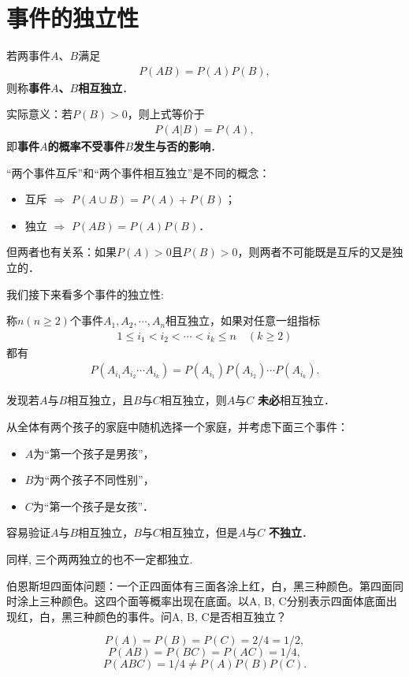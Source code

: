 \section{事件的独立性}

\begin{definition}
    若两事件$A$、$B$满足
    \begin{align*}
        P(AB)= P(A) P(B),
    \end{align*}
    则称\textbf{事件$A$、$B$相互独立}．%
\end{definition}

实际意义：若$P(B)>0$，则上式等价于
    \begin{align*}
        P(A|B)= P(A),
    \end{align*}
    即\textbf{事件$A$的概率不受事件$B$发生与否的影响}．

\begin{remark}
    “两个事件互斥”和“两个事件相互独立”是不同的概念：
    \begin{itemize}
        \item 互斥 $\Rightarrow$ $P(A\cup B)=P(A)+P(B)$；
        \item 独立 $\Rightarrow$ $P(AB)=P(A)P(B)$．
    \end{itemize}
    但两者也有关系：如果$P(A)>0$且$P(B)>0$，则两者不可能既是互斥的又是独立的．
\end{remark}

我们接下来看多个事件的独立性: 

\begin{definition}
    称$n(n\ge 2)$个事件$A_1, A_2, \cdots, A_n$相互独立，如果对任意一组指标
    \begin{align*}
        1\le i_1<i_2< \cdots <i_k\le n\quad (k\ge 2)
    \end{align*}
    都有
    \begin{align*}
        P(A_{i_1}A_{i_2}\cdots A_{i_k})=P(A_{i_1})P(A_{i_2})\cdots  P(A_{i_k}).
    \end{align*}
\end{definition}

发现若$A$与$B$相互独立，且$B$与$C$相互独立，则$A$与$C$ \textbf{未必}相互独立．
\begin{example}
    从全体有两个孩子的家庭中随机选择一个家庭，并考虑下面三个事件：
    \begin{itemize}
        \item $A$为“第一个孩子是男孩”，
        \item $B$为“两个孩子不同性别”，
        \item $C$为“第一个孩子是女孩”．
    \end{itemize}
    容易验证$A$与$B$相互独立，$B$与$C$相互独立，但是$A$与$C$ \textbf{不独立}．

    同样, 三个两两独立的也不一定都独立. 

    伯恩斯坦四面体问题：一个正四面体有三面各涂上红，白，黑三种颜色。第四面同时涂上三种颜色。这四个面等概率出现在底面。以A, B, C分别表示四面体底面出现红，白，黑三种颜色的事件。问A, B, C是否相互独立？

    $$
            P(A)=P(B)=P(C)=2/4=1/2,
        $$
        $$
            P(AB)=P(BC)=P(AC)=1/4,
        $$
        $$
            P(ABC)=1/4\neq P(A)P(B)P(C).
        $$
\end{example}

